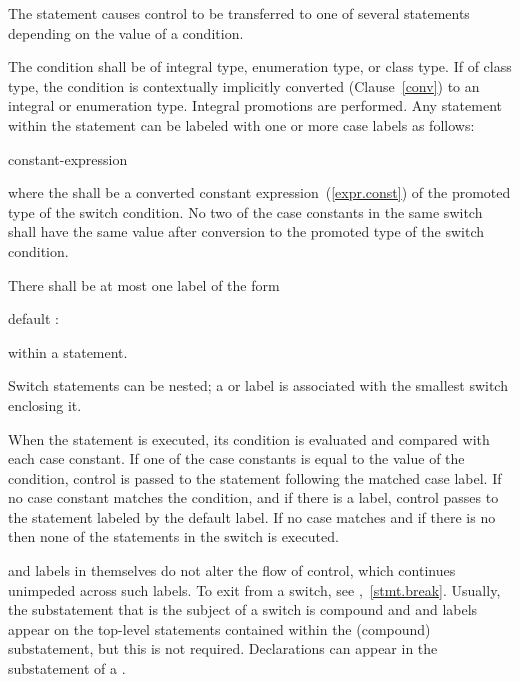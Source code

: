 \pnum
The  statement causes control to be transferred to one of
several statements depending on the value of a condition.

\pnum
The condition shall be of integral type, enumeration type, or class
type. If of class type, the
condition is contextually implicitly converted (Clause~\ref{conv}) to
an integral or enumeration type. Integral promotions are performed. Any
statement within the  statement can be labeled with one or
more case labels as follows:

\begin{ncbnf}
%
 constant-expression \terminal{:}
\end{ncbnf}

where the  shall be
a converted constant expression~(\ref{expr.const}) of the
promoted type of the switch condition. No two of the case constants in
the same switch shall have the same value after conversion to the
promoted type of the switch condition.

\pnum
{}%
There shall be at most one label of the form

\begin{codeblock}
default :
\end{codeblock}

within a  statement.

\pnum
Switch statements can be nested; a  or  label
is associated with the smallest switch enclosing it.

\pnum
When the  statement is executed, its condition is
evaluated and compared with each case constant.
%
If one of the case constants is equal to the value of the condition,
control is passed to the statement following the matched case label. If
no case constant matches the condition, and if there is a
%
 label, control passes to the statement labeled by the
default label. If no case matches and if there is no 
then none of the statements in the switch is executed.

\pnum
{} and  labels in themselves do not alter the
flow of control, which continues unimpeded across such labels. To exit
from a switch, see ,~\ref{stmt.break}.
\enternote
Usually, the substatement that is the subject of a switch is compound
and  and  labels appear on the top-level
statements contained within the (compound) substatement, but this is not
required.
%
Declarations can appear in the substatement of a
.
\exitnote%

